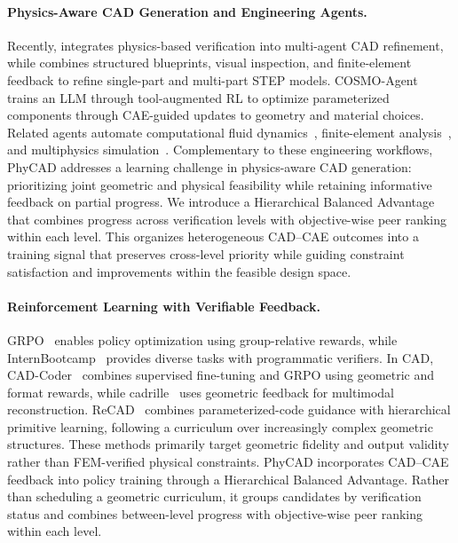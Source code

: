 \paragraph{Physics-Aware CAD Generation and Engineering Agents.}
Recently, \citep{berger2026physics} integrates physics-based verification into multi-agent CAD refinement, while \citep{son2026self} combines structured blueprints, visual inspection, and finite-element feedback to refine single-part and multi-part STEP models. COSMO-Agent~\citep{deng2026cosmo} trains an LLM through tool-augmented RL to optimize parameterized components through CAE-guided updates to geometry and material choices. Related agents automate computational fluid dynamics~\citep{chen2024metaopenfoam,xu2025cfdagent,yue2025foam}, finite-element analysis~\citep{hou2025autofea,qi2025feagpt}, and multiphysics simulation~\citep{zhang2025mooseagent}. Complementary to these engineering workflows, PhyCAD addresses a learning challenge in physics-aware CAD generation: prioritizing joint geometric and physical feasibility while retaining informative feedback on partial progress. We introduce a Hierarchical Balanced Advantage that combines progress across verification levels with objective-wise peer ranking within each level. This organizes heterogeneous CAD--CAE outcomes into a training signal that preserves cross-level priority while guiding constraint satisfaction and improvements within the feasible design space.

\paragraph{Reinforcement Learning with Verifiable Feedback.}
GRPO~\citep{shao2024deepseekmath} enables policy optimization using group-relative rewards, while InternBootcamp~\citep{li2025internbootcamp} provides diverse tasks with programmatic verifiers. In CAD, CAD-Coder~\citep{guan2026cad} combines supervised fine-tuning and GRPO using geometric and format rewards, while cadrille~\citep{kolodiazhnyi2025cadrille} uses geometric feedback for multimodal reconstruction. ReCAD~\citep{li2026recad} combines parameterized-code guidance with hierarchical primitive learning, following a curriculum over increasingly complex geometric structures. These methods primarily target geometric fidelity and output validity rather than FEM-verified physical constraints. PhyCAD incorporates CAD--CAE feedback into policy training through a Hierarchical Balanced Advantage. Rather than scheduling a geometric curriculum, it groups candidates by verification status and combines between-level progress with objective-wise peer ranking within each level.